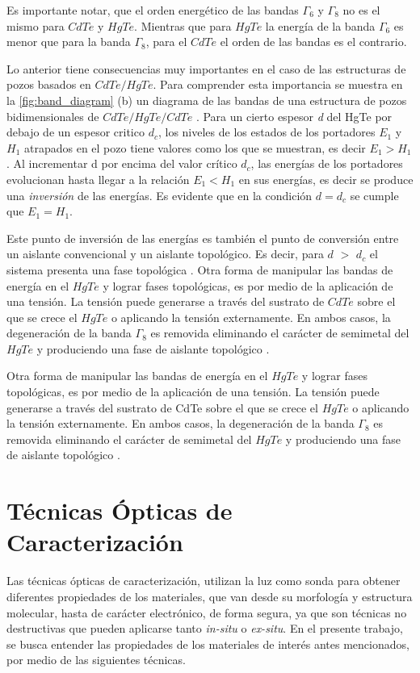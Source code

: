 Es importante notar, que el orden energético de las bandas  $ \Gamma_{6} $ y $ \Gamma_{8} $ no es el mismo para $ CdTe $ y $ HgTe $. Mientras que para $ HgTe $ la energía de la banda $ \Gamma_{6} $  es menor que para la banda  $ \Gamma_{8} $, para el $ CdTe $ el orden de las bandas es el contrario.

Lo anterior tiene consecuencias muy importantes en el caso de las estructuras de pozos basados en $ CdTe/HgTe $. Para comprender esta importancia se muestra en la \ref{fig:band_diagram} (b) un diagrama de las bandas de una estructura de pozos bidimensionales de $ CdTe/HgTe/CdTe $ \cite{Bernevig2006}. 
Para un cierto espesor \textit{d} del HgTe por debajo de un espesor critico $ d_{c} $, los niveles de los estados de los portadores $ E_{1} $ y $ H_{1} $ atrapados en el pozo tiene valores como los que se muestran, es decir $ E_{1}>H_{1} $. 
Al incrementar d por encima del valor crítico $ d_{c} $, las energías de los portadores evolucionan hasta llegar a la relación $ E_{1}<H_{1} $ en sus energías, es decir se produce una \textit{inversión} de las energías. Es evidente que en la condición $ d = d_{c} $ se cumple que $ E_{1} = H_{1} $. 

Este punto de inversión de las energías es también el punto de conversión entre un aislante convencional y un aislante topológico. Es decir, para $ d $ $ > $ $ d_{c} $ el sistema presenta una fase topológica \cite{Bernevig2006}. 
Otra forma de manipular las bandas de energía en el $ HgTe $ y lograr fases topológicas, es por medio de la aplicación de una tensión. La tensión puede generarse a través del sustrato de $ CdTe $ sobre el que se crece el $ HgTe $ o aplicando la tensión externamente. En ambos casos, la degeneración de la banda $ \Gamma_{8} $ es removida eliminando el carácter de semimetal del $ HgTe $ y produciendo una fase de aislante topológico \cite{Brne2011}\cite{Wu2014}. 

Otra forma de manipular las bandas de energía en el $ HgTe $ y lograr fases topológicas, es por medio de la aplicación de una tensión. La tensión puede generarse a través del sustrato de CdTe sobre el que se crece el $ HgTe $ o aplicando la tensión externamente. En ambos casos, la degeneración de la banda  $ \Gamma_{8} $ es removida eliminando el carácter de semimetal del $ HgTe $ y produciendo una fase de aislante topológico \cite{Brne2011}\cite{Wu2014}.

\section{Técnicas Ópticas de Caracterización}
\label{ch1-opt-charac-tech}
Las técnicas ópticas de caracterización, utilizan la luz como sonda para obtener diferentes propiedades de 
los materiales, que van desde su morfología y estructura molecular, hasta de carácter electrónico, de 
forma segura, ya que son técnicas no destructivas que pueden aplicarse tanto \textit{in-situ} o 
\textit{ex-situ}. En el presente trabajo, se busca entender las propiedades de los materiales de interés 
antes mencionados, por medio de las siguientes técnicas.

